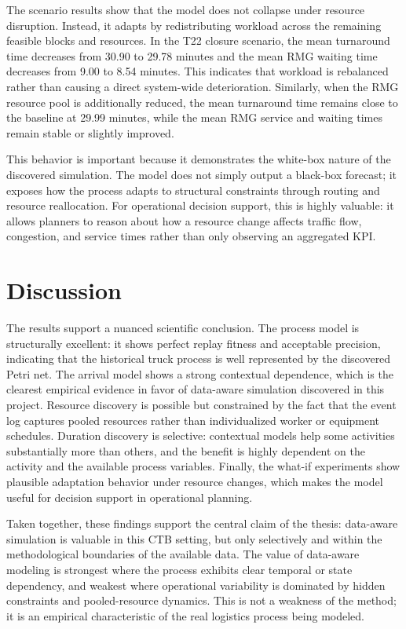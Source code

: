 The scenario results show that the model does not collapse under resource disruption. Instead, it adapts by redistributing workload across the remaining feasible blocks and resources. In the T22 closure scenario, the mean turnaround time decreases from 30.90 to 29.78 minutes and the mean RMG waiting time decreases from 9.00 to 8.54 minutes. This indicates that workload is rebalanced rather than causing a direct system-wide deterioration. Similarly, when the RMG resource pool is additionally reduced, the mean turnaround time remains close to the baseline at 29.99 minutes, while the mean RMG service and waiting times remain stable or slightly improved.

This behavior is important because it demonstrates the white-box nature of the discovered simulation. The model does not simply output a black-box forecast; it exposes how the process adapts to structural constraints through routing and resource reallocation. For operational decision support, this is highly valuable: it allows planners to reason about how a resource change affects traffic flow, congestion, and service times rather than only observing an aggregated KPI.

\section{Discussion}
\label{sec:results_discussion}

The results support a nuanced scientific conclusion. The process model is structurally excellent: it shows perfect replay fitness and acceptable precision, indicating that the historical truck process is well represented by the discovered Petri net. The arrival model shows a strong contextual dependence, which is the clearest empirical evidence in favor of data-aware simulation discovered in this project. Resource discovery is possible but constrained by the fact that the event log captures pooled resources rather than individualized worker or equipment schedules. Duration discovery is selective: contextual models help some activities substantially more than others, and the benefit is highly dependent on the activity and the available process variables. Finally, the what-if experiments show plausible adaptation behavior under resource changes, which makes the model useful for decision support in operational planning.

Taken together, these findings support the central claim of the thesis: data-aware simulation is valuable in this CTB setting, but only selectively and within the methodological boundaries of the available data. The value of data-aware modeling is strongest where the process exhibits clear temporal or state dependency, and weakest where operational variability is dominated by hidden constraints and pooled-resource dynamics. This is not a weakness of the method; it is an empirical characteristic of the real logistics process being modeled.

